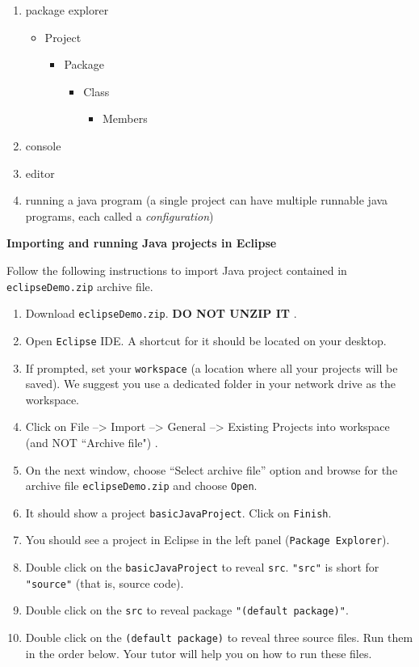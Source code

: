 \begin{questions}
\begin{enumerate}
	\item package explorer
		\begin{itemize}
		  	\item Project
		  	\begin{itemize}
		  		\item Package
				\begin{itemize}
		  			\item Class
				  	\begin{itemize}
		  				\item Members
					\end{itemize}
				\end{itemize}
			\end{itemize}
		\end{itemize}	
	\item console
	\item editor
	\item running a java program (a single project can have multiple runnable java programs, each called a \textit{configuration})
\end{enumerate}

\question \textbf{Importing and running Java projects in Eclipse} \vskip 0.5cm

Follow the following instructions to import Java project contained in \texttt{eclipseDemo.zip} archive file.

\begin{enumerate}
	\itemsep0.3em 
\item Download \texttt{eclipseDemo.zip}. \textbf{\color{red} DO NOT UNZIP IT} \color{black}.
\item Open \texttt{Eclipse} IDE. A shortcut for it should be located on your desktop.
\item If prompted, set your \texttt{workspace} (a location where all your projects will be saved). We suggest you use a dedicated folder in your network drive as the workspace.
\item Click on \color{blue} File --> Import --> General --> Existing Projects into workspace \color{red} (and NOT ``Archive file") \color{black}.
\item On the next window, choose ``Select archive file'' option and browse for the archive file \texttt{eclipseDemo.zip} and choose \texttt{Open}.
\item It should show a project \texttt{basicJavaProject}. Click on \texttt{Finish}.
\item You should see a project in Eclipse in the left panel (\texttt{Package Explorer}).
\item Double click on the \texttt{basicJavaProject} to reveal \texttt{src}. \texttt{"src"} is short for \texttt{"source"} (that is, source code).
\item Double click on the \texttt{src} to reveal package \texttt{"(default package)"}.
\item Double click on the \texttt{(default package)} to reveal three source files. Run them in the order below. Your tutor will help you on how to run these files.


\end{enumerate}
\end{questions}
